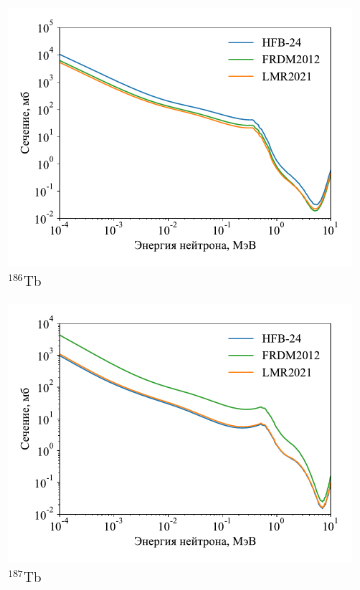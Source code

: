 \begin{figure}
\begin{subfigure}{0.48\textwidth}
    \includegraphics[width=\textwidth]{pics/cs_tb186.pdf}
    \caption{${}^{186}$Tb}
  \end{subfigure}
  \hfil
  \begin{subfigure}{0.48\textwidth}
    \centering
    \includegraphics[width=\textwidth]{pics/cs_tb187.pdf}
    \caption{${}^{187}$Tb}
  \end{subfigure}
  \\
  \begin{subfigure}{0.48\textwidth}
    \centering

\end{subfigure}
\end{figure}
